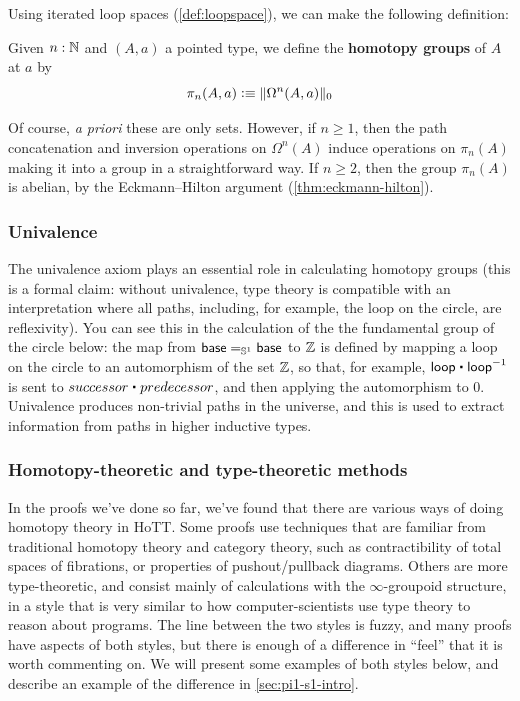 Using iterated loop spaces (\cref{def:loopspace}), we can make the
following definition:

\begin{defn}
  Given $n:\N$ and $(A,a)$ a pointed type, we define the \textbf{homotopy groups} of $A$
  at $a$ by
  \[\pi_n(A,a)\defeq \trunc0{\Omega^n(A,a)}\]
\end{defn}

Of course, \emph{a priori} these are only sets.
However, if $n\ge 1$, then the path concatenation and inversion operations on $\Omega^n(A)$ induce operations on $\pi_n(A)$ making it into a group in a straightforward way.
If $n\ge 2$, then the group $\pi_n(A)$ is abelian, by the Eckmann--Hilton argument (\autoref{thm:eckmann-hilton}).


\subsubsection{Univalence}  The univalence axiom plays an essential role in
  calculating homotopy groups (this is a formal claim: without
  univalence, type theory is compatible with an interpretation where all
  paths, including, for example, the loop on the circle, are reflexivity).  You
  can see this in the calculation of the the fundamental group of the
  circle below: the map from $\id[\Sn ^1] \base \base$ to $\Z$
  is defined by mapping a loop on the circle to an automorphism of the set
  $\Z$, so that, for example, $\lloop \ct \opp \lloop$ is sent
  to $successor \ct predecessor$, and then applying the automorphism to
  0. Univalence produces non-trivial paths in the universe, and this is
  used to extract information from paths in higher inductive types.

\subsubsection{Homotopy-theoretic and type-theoretic methods}  In the
proofs we've done so far, we've found that there are various ways of
doing homotopy theory in HoTT.  Some proofs use techniques that are
familiar from traditional homotopy theory and category theory, such as
contractibility of total spaces of fibrations, or properties of
pushout/pullback diagrams.  Others are more type-theoretic, and consist
mainly of calculations with the $\infty$-groupoid structure, in a style
that is very similar to how computer-scientists use type theory to
reason about programs.  The line between the two styles is fuzzy, and
many proofs have aspects of both styles, but there is enough of a
difference in ``feel'' that it is worth commenting on.  We will present
some examples of both styles below, and describe an example of the
difference in \autoref{sec:pi1-s1-intro}.

